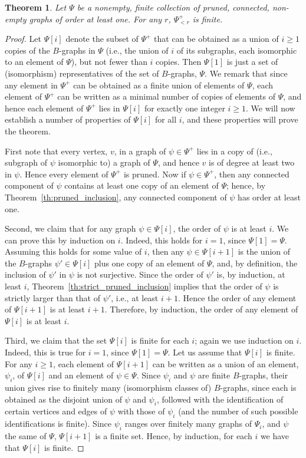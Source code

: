 \documentclass{memo-l}
\theoremstyle{plain}
\newtheorem{theorem}{Theorem}[section]
\theoremstyle{definition}
\numberwithin{section}{chapter}
\numberwithin{equation}{chapter}
\theoremstyle{plain}
\theoremstyle{definition}
\begin{document}
\begin{theorem} Let $\Psi$ be a nonempty, finite collection of 
pruned, connected, non-empty graphs
of order at least one.
For any $r$, $\Psi_{<r}^+$ is finite.
\end{theorem}
\begin{proof}
Let $\Psi[i]$ denote the subset of $\Psi^+$
that can be obtained
as a union of $i\ge 1$ copies of the $B$-graphs in $\Psi$ (i.e., the union
of $i$ of its subgraphs, each isomorphic to an element of $\Psi$),
but not fewer than
$i$ copies.
Then $\Psi[1]$ is just a set of (isomorphism) representatives of 
the set of $B$-graphs, $\Psi$.  
We remark that since any element in $\Psi^+$ can be obtained as
a finite union of elements of $\Psi$, each element of $\Psi^+$
can be written as a minimal number of copies of elements of $\Psi$,
and hence each element of $\Psi^+$ lies in $\Psi[i]$ for exactly
one integer $i\ge 1$.
We will now establish a number of properties of $\Psi[i]$ for all $i$,
and these properties will prove the theorem.

First note that every vertex, $v$, in a graph
of $\psi\in\Psi^+$ lies
in a copy of (i.e., subgraph of $\psi$ isomorphic to) a graph
of $\Psi$, and hence $v$ is of degree at least two in $\psi$.
Hence every element of $\Psi^+$ is pruned.
Now if $\psi\in\Psi^+$, then any connected component of $\psi$
contains at
least one copy of an element of $\Psi$; hence,
by Theorem~\ref{th:pruned_inclusion}, any connected component of
$\psi$ has order at least one.

Second, we claim that for any graph $\psi\in\Psi[i]$, the order of
$\psi$ is at least $i$.  We can prove this by induction on $i$.
Indeed, this holds for $i=1$, since $\Psi[1]=\Psi$.  Assuming this holds
for some value of $i$, then any $\psi\in\Psi[i+1]$ is the union of
the $B$-graphs $\psi'\in\Psi[i]$ plus one copy of an element of
$\Psi$, and, by definition, the inclusion of $\psi'$ in $\psi$ is
not surjective.
Since the order of $\psi'$ is, by induction, at least $i$,
Theorem~\ref{th:strict_pruned_inclusion} implies that the
order of $\psi$ is strictly larger than that of $\psi'$, i.e., at least
$i+1$.
Hence the order of any element of $\Psi[i+1]$ is at least $i+1$.
Therefore, by induction,
the order of any element of $\Psi[i]$ is at least $i$.

Third, we claim that the set $\Psi[i]$ is finite for each $i$;
again we use induction on $i$.
Indeed, this is true for $i=1$, since $\Psi[1]=\Psi$.
Let us assume that $\Psi[i]$ is finite.
For any $i\ge 1$, each element of $\Psi[i+1]$ can be written as
a union of an element, $\psi_i$, of $\Psi[i]$ and an element 
of $\psi\in\Psi$.  Since $\psi_i$ and $\psi$ are finite $B$-graphs,
their union gives rise to finitely many (isomorphism classes of)
$B$-graphs, since each is obtained as the
disjoint union of $\psi$ and $\psi_i$, followed with the identification
of certain vertices and edges of $\psi$ with those of $\psi_i$
(and the number of such possible identifications is finite).
Since $\psi_i$ ranges over finitely many graphs of $\Psi_i$, and
$\psi$ the same of $\Psi$,
$\Psi[i+1]$ is a finite set.
Hence, by induction, for each $i$ we have that $\Psi[i]$ is finite.


\end{proof}
\end{document}
